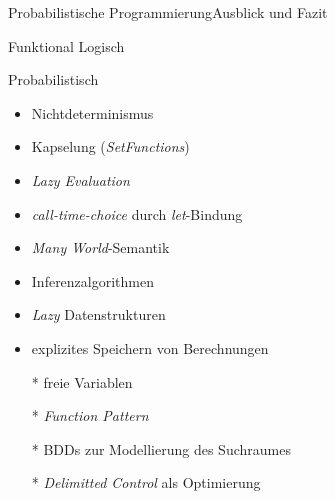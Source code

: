 \documentclass{beamer}
\begin{document}
\begin{frame}{Probabilistische Programmierung}{Ausblick und Fazit}
\begin{minipage}{.48\textwidth}
Funktional Logisch
\end{minipage}
%
\hfill
%
\begin{minipage}{.48\textwidth}
Probabilistisch
\end{minipage}
%
\vfill
%
\begin{minipage}{.48\textwidth}
\begin{itemize}
\item Nichtdeterminismus
\item Kapselung (\emph{SetFunctions})
\item \emph{Lazy Evaluation}
\item \emph{call-time-choice} durch \emph{let}-Bindung
\end{itemize}
\end{minipage}
% 
\hfill
%
\begin{minipage}{.48\textwidth}
\begin{itemize}
\item \emph{Many World}-Semantik
\item Inferenzalgorithmen
\item \emph{Lazy} Datenstrukturen
\item explizites Speichern von Berechnungen
\end{itemize}
\end{minipage}
%
\vfill
%
\begin{minipage}{.48\textwidth}
\begin{itemize}
\item [\color{green}*] freie Variablen
\item [\color{green}*] \emph{Function Pattern}
\end{itemize}
\end{minipage}
%
\hfill
%
\begin{minipage}{.48\textwidth}
\begin{itemize}
\item [\color{red}*] BDDs zur Modellierung des Suchraumes
\item [\color{red}*] \emph{Delimitted Control} als Optimierung
\end{itemize}
\end{minipage}

\end{frame}

\end{document}
